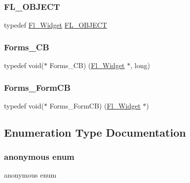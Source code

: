 \mbox{\label{forms_8_h_a6a6a510bc17d8d92f15ad10fdb20cff4}} 
\subsubsection{\texorpdfstring{F\+L\+\_\+\+O\+B\+J\+E\+CT}{FL\_OBJECT}}
{\footnotesize\ttfamily typedef \hyperlink{class_fl___widget}{Fl\+\_\+\+Widget} \hyperlink{forms_8_h_a6a6a510bc17d8d92f15ad10fdb20cff4}{F\+L\+\_\+\+O\+B\+J\+E\+CT}}

\mbox{\label{forms_8_h_a93a9878bd5445be5505c060c990ed9e0}} 
\subsubsection{\texorpdfstring{Forms\+\_\+\+CB}{Forms\_CB}}
{\footnotesize\ttfamily typedef void($\ast$ Forms\+\_\+\+CB) (\hyperlink{class_fl___widget}{Fl\+\_\+\+Widget} $\ast$, long)}

\mbox{\label{forms_8_h_ad97f38473f6f13b5ab389030a4c8887c}} 
\subsubsection{\texorpdfstring{Forms\+\_\+\+Form\+CB}{Forms\_FormCB}}
{\footnotesize\ttfamily typedef void($\ast$ Forms\+\_\+\+Form\+CB) (\hyperlink{class_fl___widget}{Fl\+\_\+\+Widget} $\ast$)}



\subsection{Enumeration Type Documentation}
\mbox{\label{forms_8_h_ae4d5251432e1a9e6803c0240cc492e18}} 
\subsubsection{\texorpdfstring{anonymous enum}{anonymous enum}}
{\footnotesize\ttfamily anonymous enum}

